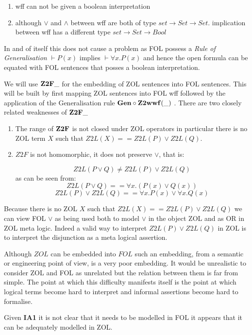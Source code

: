 \begin{enumerate}
\item wff can not be given a boolean interpretation
\item although $\vee$ and $\wedge$ between wff are both of type $set\rightarrow Set \rightarrow Set$. implication between wff has a different  type $set\rightarrow Set \rightarrow Bool$
\end{enumerate}   
In and of itself this does not cause a problem as FOL possess a \emph{Rule of Generalisation} $\vdash P(x)$ implies $\vdash \forall x. P(x)$ and hence the  open formula can be equated with FOL sentences  that posses a boolean interpretation.

We will use ${\bf Z2F}\_$ for  the embedding of ZOL sentences into FOL sentences.  This will be built by first mapping ZOL sentences into FOL wff followed by the application of the Generalisation rule ${\bf Gen\circ Z2wwf}(\_)$ . There are two closely related weaknesses of ${\bf Z2F}\_$ 
\begin{enumerate}
\item The range of ${\bf Z2F}$ is not closed under ZOL operators in particular  there is no ZOL term $X$ such that $Z2L(X) == Z2L(P) \vee Z2L(Q)$. 

\item $Z2F$ is not homomorphic, it does not preserve $\vee$, that is:

\[Z2L(P\vee Q) \not= Z2L(P) \vee Z2L(Q)\]  
as can be seen from:
\[Z2L(P\vee Q) == \forall x. (P(x)\vee Q(x))\] 
\[Z2L(P) \vee Z2L(Q) == \forall x. P(x)\vee \forall x. Q(x)\]
\end{enumerate}

Because there is no ZOL $X$ such that $Z2L(X) == Z2L(P) \vee Z2L(Q)$ we can view FOL $\vee$ as being used both to model  $\vee$ in the object ZOL  and as OR in  ZOL meta logic. Indeed a valid way to interpret $Z2L(P) \vee Z2L(Q)$ in ZOL is to interpret the disjunction as a meta logical assertion.




Although $ZOL$ can be embedded into $FOL$ such an embedding, from a semantic or engineering point of view,  is a very poor embedding.
It would be unrealistic to consider ZOL and FOL as unrelated but the relation between them is far from simple. The point at which this difficulty  manifests itself is the point at which logical terms become hard to interpret and informal assertions become hard to formalise.

Given {\bf IA1} it is not clear that it needs to be modelled in FOL it appears  that it can be adequately modelled in ZOL. 



